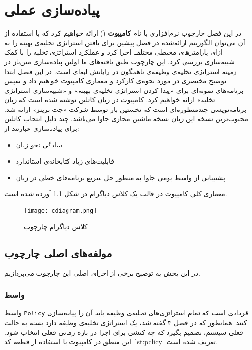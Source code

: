 \chapter{پیاده‌سازی عملی}
در این فصل چارچوب نرم‌افزاری با نام \textbf{کامپیوت} () ارائه خواهیم کرد که با استفاده از آن می‌توان الگوریتم ارائه‌شده در فصل پیشین برای یافتن استراتژی تخلیه‌ی بهینه را به ازای پارامترهای محیطی مختلف اجرا کرد و عملکرد استراتژی تخلیه را با کمک شبیه‌سازی بررسی کرد. این چارچوب طبق یافته‌های ما اولین پیاده‌سازی متن‌باز در زمینه استراتژی تخلیه‌ی وظیفه‌ی ناهمگون در رایانش لبه‌ای است. در این فصل ابتدا توضیح مختصری در مورد نحوه‌ی کارکرد و معماری کامپیوت خواهیم داد و سپس برنامه‌های نمونه‌ای برای «پیدا کردن استراتژی تخلیه‌ی بهینه» و «شبیه‌سازی استراتژی تخلیه» ارائه خواهیم کرد. کامپیوت در زبان کاتلین نوشته شده است که زبان برنامه‌نویسی چندمنظوره‌ای است که نخستین بار توسط شرکت «جت برینز» ارائه شد. محبوب‌ترین نسخه این زبان نسخه ماشین مجازی جاوا می‌باشد. چند دلیل انتخاب کاتلین برای پیاده‌سازی \CurrentProject عبارتند از:
\begin{itemize}
	\item سادگی نحو زبان
	\item قابلیت‌های زیاد کتابخانه‌ی استاندارد
	\item پشتیبانی از واسط بومی جاوا به منظور حل سریع برنامه‌های خطی در زبان 
\end{itemize}
معماری کلی کامپیوت در قالب یک کلاس دیاگرام در شکل \ref{fig:classdiagram} آورده شده است. 
\begin{figure}[H]
	\centering
	\texttt{[image: cdiagram.png]}
	\caption{کلاس دیاگرام چارچوب }
	\label{fig:classdiagram}
\end{figure}
\section{مولفه‌های اصلی چارچوب }
در این بخش به توضیح برخی از اجزای اصلی این چارچوب می‌پردازیم.
\subsection{واسط }
واسط \texttt{\footnotesize Policy} قردادی است که تمام استراتژی‌های تخلیه‌ی وظیفه باید آن را پیاده‌سازی کنند. همانطور که در فصل ۴ گفته شد، یک استراتژی تخلیه‌ی وظیفه دارد بسته به حالت فعلی سیستم، تصمیم بگیرد که چه کنشی برای اجرا در بازه زمانی فعلی انتخاب شود. این منطق در کامپیوت با استفاده از قطعه کد \ref{lst:policy} تعریف شده است.

